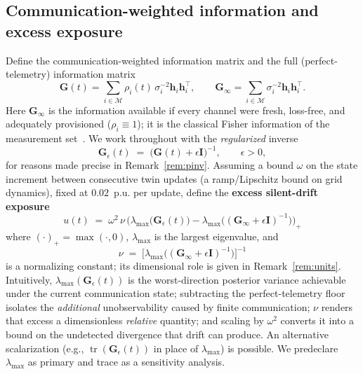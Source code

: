 \documentclass[journal]{IEEEtran}
\theoremstyle{plain}
\theoremstyle{definition}
\theoremstyle{remark}
\newcommand{\bh}{\mathbf{h}}
\newcommand{\bG}{\mathbf{G}}
\newcommand{\bI}{\mathbf{I}}
\newcommand{\lmax}{\lambda_{\max}}
\begin{document}
\subsection{Communication-weighted information and excess exposure}
Define the communication-weighted information matrix and the full
(perfect-telemetry) information matrix
\begin{equation}
\bG(t)=\!\sum_{i\in\mathcal{M}}\!\rho_i(t)\,\sigma_i^{-2}\bh_i\bh_i^{\top},
\qquad
\bG_{\infty}=\!\sum_{i\in\mathcal{M}}\!\sigma_i^{-2}\bh_i\bh_i^{\top}.
\label{eq:information}
\end{equation}
Here $\bG_{\infty}$ is the information available if every channel were
fresh, loss-free, and adequately provisioned ($\rho_i\equiv1$); it is the
classical Fisher information of the measurement
set~\cite{monticelli1985,wang2018crb}. We work throughout with the
\emph{regularized} inverse
\begin{equation}
\bG_{\epsilon}(t)\;=\;\big(\bG(t)+\epsilon\bI\big)^{-1},
\qquad \epsilon>0,
\label{eq:regularized}
\end{equation}
for reasons made precise in Remark~\ref{rem:pinv}. Assuming a bound
$\omega$ on the state increment between consecutive twin updates (a
ramp/Lipschitz bound on grid dynamics), fixed at $0.02$~p.u. per update,
define the \textbf{excess silent-drift exposure}
\begin{equation}
\boxed{\;
u(t)\;=\;\omega^{2}\,\nu\,
\Big(\lmax\!\big(\bG_{\epsilon}(t)\big)
     -\lmax\!\big((\bG_{\infty}+\epsilon\bI)^{-1}\big)\Big)_{\!+}\;}
\label{eq:exposure}
\end{equation}
where $(\cdot)_{+}=\max(\cdot,0)$, $\lmax$ is the largest eigenvalue, and
\begin{equation}
\nu \;=\; \Big[\lmax\!\big((\bG_{\infty}+\epsilon\bI)^{-1}\big)\Big]^{-1}
\label{eq:nu}
\end{equation}
is a normalizing constant; its dimensional role is given in
Remark~\ref{rem:units}.
Intuitively, $\lmax(\bG_{\epsilon}(t))$ is the worst-direction posterior
variance achievable under the current communication state; subtracting the
perfect-telemetry floor isolates the \emph{additional} unobservability
caused by finite communication; $\nu$ renders that excess a dimensionless
\emph{relative} quantity; and scaling by $\omega^{2}$ converts it into a
bound on the undetected divergence that drift can produce. An alternative
scalarization (e.g., $\operatorname{tr}(\bG_{\epsilon}(t))$ in place of
$\lmax$) is possible. We predeclare $\lmax$ as primary and trace as a
sensitivity analysis.
\end{document}
